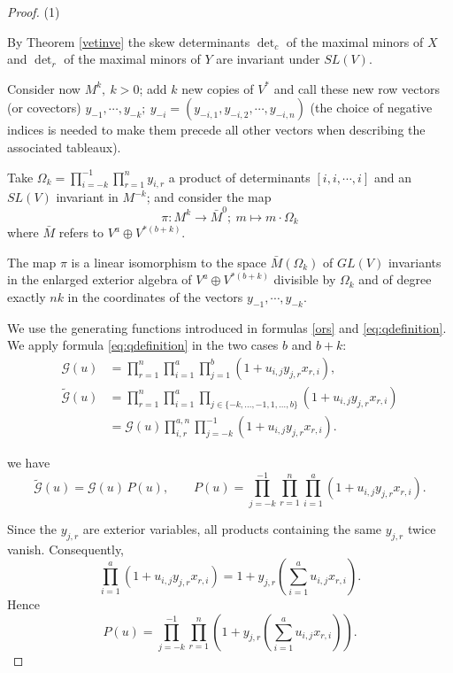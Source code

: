 \documentclass[10pt]{amsart}
\theoremstyle{definition}
\theoremstyle{remark}
\begin{document}
\begin{proof} (1)  

By Theorem \ref{vetinve}    the skew determinants $\det_c$ of the maximal minors of $X$ and $\det_r$ of the maximal minors of   $Y$ are invariant under $SL(V)$.\medskip


Consider now $M^k,\ k>0$; add $k$ new copies  of $V^*$  and  call these new row vectors (or covectors)  $y_{-1},\cdots,y_{-k};\ y_{-i}=(y_{-i,1},y_{-i,2},\cdots,y_{-i,n})$ (the choice of negative indices is needed to make them precede all other vectors when  describing the associated tableaux).

 Take $ \Omega_k=\prod_{i=-k}^{-1}\prod_{r=1}^ny_{i,r}$  a product of determinants $[i,i,\cdots,i]$ and an $SL(V)$ invariant in $M^{-k}$;  and consider  the map  $$\pi:M^k \to \bar  M^0 ;\  m\mapsto m\cdot  \Omega_k$$  where $\bar M$ refers to  $V^a\oplus V^{*(b+k)}$.


The map $\pi$ is a linear isomorphism  to the space $\bar M( \Omega_k)$ of $GL(V)$    invariants  in the enlarged
exterior algebra of $V^a\oplus V^{*(b+k)}$ divisible by $ \Omega_k$ and of degree exactly $nk$ in the coordinates   of the  vectors  $y_{-1},\cdots,y_{-k}$.\medskip


We use the generating functions introduced in formulas \eqref{ors} and \eqref{eq:qdefinition}.   We apply formula \eqref{eq:qdefinition}  in the two cases  $b$ and $b+k$:
\begin{equation}\label{eq1}
\begin{aligned}
 \mathcal G(u)&=\prod_{r=1}^n\prod_{i=1}^a\prod_{j=1}^b(1+u_{i,j}y_{j,r}x_{r,i}),\\
 \widetilde{\mathcal G}(u)&=\prod_{r=1}^n\prod_{i=1}^a\prod_{j\in\{-k,\ldots,-1,1,\ldots,b\}}(1+u_{i,j}y_{j,r}x_{r,i})\\
 &=\mathcal G(u)\prod_{i,r}^{a,n}\prod_{j=-k}^{-1}(1+u_{i,j}y_{j,r}x_{r,i}).
\end{aligned}
\end{equation}   


we have
\[
\widetilde{\mathcal G}(u)
=\mathcal G(u)\,P(u),
\qquad
P(u)=
\prod_{j=-k}^{-1}\prod_{r=1}^n
\prod_{i=1}^a(1+ u_{i,j}y_{ j,r}x_{ r,i}).
\]

Since the $y_{j,r}$ are exterior variables, all
products containing the same $y_{ j,r}$ twice vanish.
Consequently,
\[
\prod_{i=1}^a(1+u_{i,j}y_{ j,r}x_{ r,i})
=
1+y_{ j,r}\left(\sum_{i=1}^a u_{i,j}x_{ r,i}\right) .
\]
Hence
\[
P(u)=
\prod_{j=-k}^{-1}\prod_{r=1}^n
\left(1+
 y_{ j,r}\left(\sum_{i=1}^a u_{i,j}x_{ r,i}\right)\right) .
\]


\end{proof}
\end{document}
